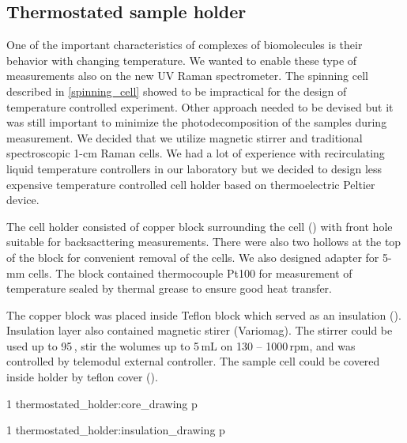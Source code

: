 \subsection{Thermostated sample holder}

One of the important characteristics of complexes of biomolecules is their
behavior with changing temperature. We wanted to enable these type of
measurements also on the new UV Raman spectrometer. The spinning cell described
in \cref{spinning_cell} showed to be impractical for the design of temperature
controlled experiment. Other approach needed to be devised but it was still
important to minimize the photodecomposition of the samples during measurement.
We decided that we utilize magnetic stirrer and traditional spectroscopic
1-cm Raman cells. We had a lot of experience with recirculating liquid
temperature controllers in our laboratory but we decided to design less
expensive temperature controlled cell holder based on thermoelectric Peltier
device.

The cell holder consisted of copper block surrounding the cell
()
with front hole suitable for backsacttering measurements. There were also two
hollows at the top of the block for convenient removal of the cells. We also
designed adapter for 5-mm cells. The block contained thermocouple Pt100 for
measurement of temperature sealed by thermal grease to ensure good heat
transfer.

The copper block was placed inside Teflon block which served as an insulation
().
Insulation layer also contained magnetic stirer (Variomag). The stirrer could
be used up to 95\,\textcelsius{}, stir the wolumes up to 5\,mL on
130 -- 1000\,rpm, and was controlled by telemodul external controller. The
sample cell could be covered inside holder by teflon cover
().

%
{1}%
{thermostated_holder:core_drawing}
{p}

%
{1}%
{thermostated_holder:insulation_drawing}
{p}

